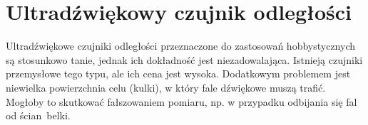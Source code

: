\section{Ultradźwiękowy czujnik odległości}

Ultradźwiękowe czujniki odległości przeznaczone do zastosowań hobbystycznych są stosunkowo tanie, jednak ich dokładność jest niezadowalająca. Istnieją czujniki przemysłowe tego typu, ale ich cena jest wysoka. Dodatkowym problemem jest niewielka powierzchnia celu (kulki), w który fale dźwiękowe muszą trafić. Mogłoby to skutkować fałszowaniem pomiaru, np. w przypadku odbijania się fal od ścian~belki.

%
